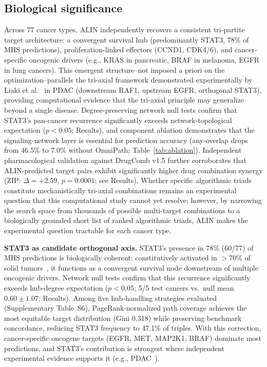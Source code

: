 \documentclass[times, twoside, watermark]{zHenriquesLab-StyleBioRxiv}
\begin{document}
\subsection*{Biological significance}
Across 77 cancer types, ALIN independently recovers a consistent tri-partite target architecture: a convergent survival hub (predominantly STAT3, 78\% of MHS predictions), proliferation-linked effectors (CCND1, CDK4/6), and cancer-specific oncogenic drivers (e.g., KRAS in pancreatic, BRAF in melanoma, EGFR in lung cancers). This emergent structure--not imposed a priori on the optimization--parallels the tri-axial framework demonstrated experimentally by Liaki et al.~\cite{Liaki2025} in PDAC (downstream RAF1, upstream EGFR, orthogonal STAT3), providing computational evidence that the tri-axial principle may generalize beyond a single disease. Degree-preserving network null tests confirm that STAT3's pan-cancer recurrence significantly exceeds network-topological expectation ($p < 0.05$; Results), and component ablation demonstrates that the signaling-network layer is essential for prediction accuracy (any-overlap drops from 46.5\% to 7.0\% without OmniPath; Table~\ref{tab:ablation}). Independent pharmacological validation against DrugComb v1.5 further corroborates that ALIN-predicted target pairs exhibit significantly higher drug combination synergy (ZIP: $\Delta = +2.59$, $p = 0.0001$; see Results). Whether specific algorithmic triads constitute mechanistically tri-axial combinations remains an experimental question that this computational study cannot yet resolve; however, by narrowing the search space from thousands of possible multi-target combinations to a biologically grounded short list of ranked algorithmic triads, ALIN makes the experimental question tractable for each cancer type.

\textbf{STAT3 as candidate orthogonal axis.} STAT3's presence in 78\% (60/77) of MHS predictions is biologically coherent: constitutively activated in $>$70\% of solid tumors~\cite{Yu2004,Frank2007}, it functions as a convergent survival node downstream of multiple oncogenic drivers. Network null tests confirm that this recurrence significantly exceeds hub-degree expectation ($p < 0.05$; 5/5 test cancers vs.\ null mean $0.60 \pm 1.07$; Results). Among five hub-handling strategies evaluated (Supplementary Table~S6), PageRank-normalized path coverage achieves the most equitable target distribution (Gini 0.318) while preserving benchmark concordance, reducing STAT3 frequency to 47.1\% of triples. With this correction, cancer-specific oncogene targets (EGFR, MET, MAP2K1, BRAF) dominate most predictions, and STAT3's contribution is strongest where independent experimental evidence supports it (e.g., PDAC~\cite{Liaki2025}).
\end{document}
